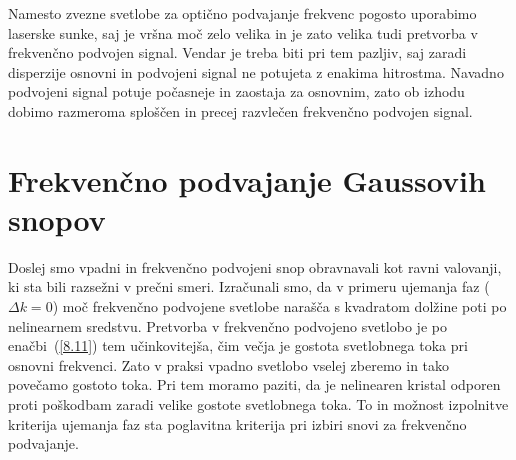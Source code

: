 \begin{remark}
Namesto zvezne svetlobe za optično podvajanje frekvenc pogosto uporabimo laserske sunke, saj je 
vršna moč zelo velika in je zato velika tudi pretvorba v frekvenčno podvojen signal. Vendar je treba biti 
pri tem pazljiv, saj zaradi disperzije osnovni in podvojeni signal ne potujeta z enakima hitrostma.
Navadno podvojeni signal potuje počasneje in zaostaja za osnovnim, zato ob izhodu dobimo razmeroma
sploščen in precej razvlečen frekvenčno podvojen signal.
\end{remark}

\section{Frekvenčno podvajanje Gaussovih snopov}
Doslej smo vpadni in frekvenčno podvojeni snop obravnavali kot ravni valovanji,
ki sta bili razsežni v prečni smeri. Izračunali smo, da v primeru 
ujemanja faz ($\Delta k=0$)
moč frekvenčno podvojene svetlobe narašča s kvadratom dolžine poti po nelinearnem
sredstvu. Pretvorba v frekvenčno podvojeno svetlobo je po enačbi~(\ref{8.11}) tem
učinkovitejša, čim večja je gostota svetlobnega toka pri osnovni frekvenci.
Zato v praksi vpadno svetlobo vselej zberemo in tako povečamo gostoto toka. 
Pri tem moramo paziti, da je nelinearen kristal odporen proti poškodbam
zaradi velike gostote svetlobnega toka. To in možnost izpolnitve kriterija ujemanja 
faz sta poglavitna kriterija pri izbiri snovi za frekvenčno podvajanje. 

